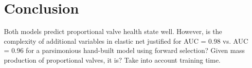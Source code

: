 \section{Conclusion}

Both models predict proportional valve health state well.
However, is the complexity of additional variables in elastic net justified for AUC = 0.98 vs. AUC = 0.96 for a parsimonious hand-built model using forward selection?
Given mass production of proportional valves, it is?
Take into account training time.
